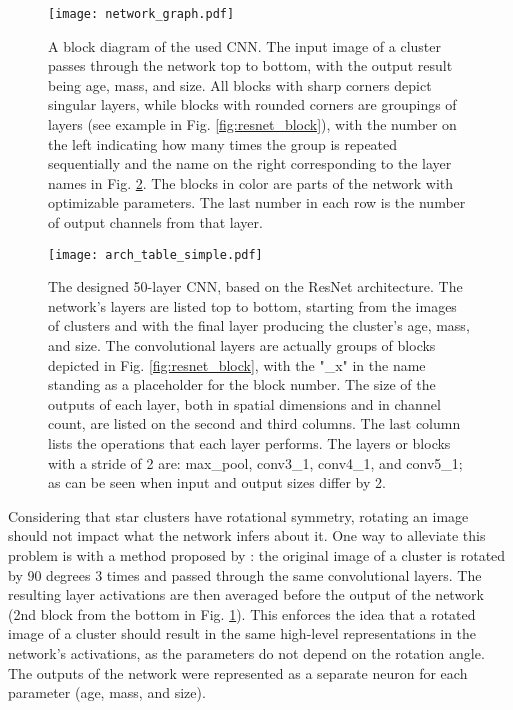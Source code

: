 \documentclass{aa}
\begin{document}
\begin{figure}
    \centering
        \texttt{[image: network\_graph.pdf]}
    \caption{A block diagram of the used CNN. The input image of a cluster passes through the network top to bottom, with the output result being age, mass, and size. All blocks with sharp corners depict singular layers, while blocks with rounded corners are groupings of layers (see example in Fig. \ref{fig:resnet_block}), with the number on the left indicating how many times the group is repeated sequentially and the name on the right corresponding to the layer names in Fig. \ref{fig:network_architecture_table}. The blocks in color are parts of the network with optimizable parameters. The last number in each row is the number of output channels from that layer.}
    \label{fig:network_architecture_graph}
\end{figure}

\begin{figure}
    \centering
        \texttt{[image: arch\_table\_simple.pdf]}
    \caption{The designed 50-layer CNN, based on the ResNet architecture. The network's layers are listed top to bottom, starting from the images of clusters and with the final layer producing the cluster's age, mass, and size. The convolutional layers are actually groups of blocks depicted in Fig. \ref{fig:resnet_block}, with the "\_x" in the name standing as a placeholder for the block number. The size of the outputs of each layer, both in spatial dimensions and in channel count, are listed on the second and third columns. The last column lists the operations that each layer performs. The layers or blocks with a stride of 2 are: max\_pool, conv3\_1, conv4\_1, and conv5\_1; as can be seen when input and output sizes differ by 2.}
    \label{fig:network_architecture_table}
\end{figure}

Considering that star clusters have rotational symmetry, rotating an image should not impact what the network infers about it. One way to alleviate this problem is with a method proposed by \citet{dieleman}: the original image of a cluster is rotated by 90 degrees 3 times and passed through the same convolutional layers. The resulting layer activations are then averaged before the output of the network (2nd block from the bottom in Fig. \ref{fig:network_architecture_graph}). This enforces the idea that a rotated image of a cluster should result in the same high-level representations in the network's activations, as the parameters do not depend on the rotation angle. The outputs of the network were represented as a separate neuron for each parameter (age, mass, and size).
\end{document}

